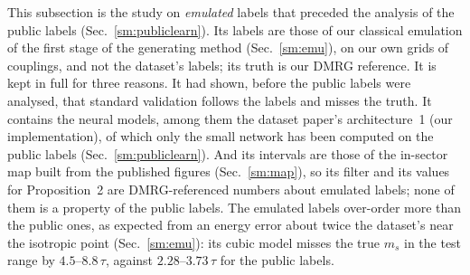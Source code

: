 \documentclass[aps,prx,onecolumn,10pt,nofootinbib,longbibliography,floatfix]{revtex4-2}
\theoremstyle{remark}
\newcommand{\ms}{m_s}
\begin{document}
This subsection is the study on \emph{emulated} labels that preceded the analysis of the public labels
(Sec.~\ref{sm:publiclearn}). Its labels are those of our classical emulation of the first stage of the generating
method (Sec.~\ref{sm:emu}), on our own grids of couplings, and not the dataset's labels; its truth is our DMRG
reference. It is kept in full for three reasons. It had shown, before the public labels were analysed, that standard
validation follows the labels and misses the truth. It contains the neural models, among them the dataset paper's
architecture~1 (our implementation), of which only the small network has been computed on the public labels %
(Sec.~\ref{sm:publiclearn}). And its
intervals are those of the in-sector map built from the published figures (Sec.~\ref{sm:map}), so its filter and its
values for Proposition~2 are DMRG-referenced numbers about emulated labels; none of them is a property of the public %
labels. The emulated labels over-order more than the public ones, as expected from an energy error about twice
the dataset's near the isotropic point (Sec.~\ref{sm:emu}): its cubic model misses the true $\ms$ in the
test range by $4.5$--$8.8\,\tau$, against $2.28$--$3.73\,\tau$ for the public labels. %
\end{document}
